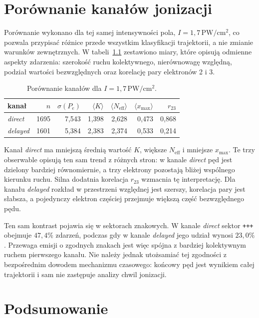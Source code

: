 \documentclass[12pt,letterpaper,oneside]{report}
\numberwithin{equation}{chapter}
\numberwithin{figure}{chapter}
\numberwithin{table}{chapter}
\newcommand{\Pe}{\ensuremath{P_e}}
\newcommand{\Neff}{\ensuremath{N_{\mathrm{eff}}}}
\newcommand{\xmax}{\ensuremath{x_{\max}}}
\newcommand{\direct}{\textit{direct}}
\newcommand{\delayed}{\textit{delayed}}
\begin{document}
\chapter{Porównanie kanałów jonizacji}

Porównanie wykonano dla tej samej intensywności pola,
\(I=1{,}7\,\mathrm{PW/cm^2}\), co pozwala przypisać różnice przede
wszystkim klasyfikacji trajektorii, a nie zmianie warunków zewnętrznych.
W tabeli~\ref{tab:comparison} zestawiono miary, które opisują odmienne
aspekty zdarzenia: szerokość ruchu kolektywnego, nierównowagę względną,
podział wartości bezwzględnych oraz korelację pary elektronów 2 i 3.

\begin{table}[htbp]
\centering
\caption{Porównanie kanałów dla \(I=1{,}7\,\mathrm{PW/cm^2}\).}
\label{tab:comparison}
\begin{tabular}{lrrrrrr}
\toprule
kanał & \(n\) & \(\sigma(\Pe)\) & \(\langle K\rangle\) &
\(\langle\Neff\rangle\) & \(\langle\xmax\rangle\) & \(r_{23}\)\\
\midrule
\direct  & 1695 & 7,543 & 1,398 & 2,628 & 0,473 & 0,868\\
\delayed & 1601 & 5,384 & 2,383 & 2,374 & 0,533 & 0,214\\
\bottomrule
\end{tabular}
\end{table}

Kanał \direct{} ma mniejszą średnią wartość \(K\), większe
\(\Neff\) i mniejsze \(\xmax\). Te trzy obserwable opisują ten sam
trend z różnych stron: w kanale \direct{} pęd jest dzielony bardziej
równomiernie, a trzy elektrony pozostają bliżej wspólnego kierunku ruchu.
Silna dodatnia korelacja \(r_{23}\) wzmacnia tę interpretację. Dla kanału
\delayed{} rozkład w przestrzeni względnej jest szerszy, korelacja pary
jest słabsza, a pojedynczy elektron częściej przejmuje większą część
bezwzględnego pędu.

Ten sam kontrast pojawia się w sektorach znakowych. W kanale \direct{}
sektor \texttt{+++} obejmuje \(47{,}4\%\) zdarzeń, podczas gdy w kanale
\delayed{} jego udział wynosi \(23{,}0\%\). Przewaga emisji o zgodnych
znakach jest więc spójna z bardziej kolektywnym ruchem pierwszego kanału.
Nie należy jednak utożsamiać tej zgodności z bezpośrednim dowodem
mechanizmu czasowego: końcowy pęd jest wynikiem całej trajektorii i sam
nie zastępuje analizy chwil jonizacji.

\chapter{Podsumowanie}
\end{document}
